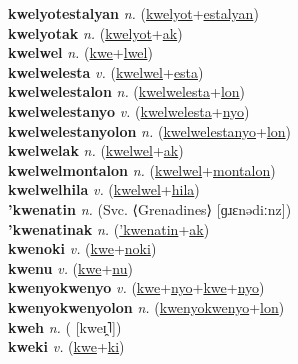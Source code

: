 \textbf{kwelyotestalyan} \textit{n.} (\hyperref[kwelyot]{kwelyot}+\hyperref[estalyan]{estalyan})
 \label{kwelyotestalyan} \\
\textbf{kwelyotak} \textit{n.} (\hyperref[kwelyot]{kwelyot}+\hyperref[ak]{ak})
 \label{kwelyotak} \\
\textbf{kwelwel} \textit{n.} (\hyperref[kwe]{kwe}+\hyperref[lwel]{lwel})
 \label{kwelwel} \\
\textbf{kwelwelesta} \textit{v.} (\hyperref[kwelwel]{kwelwel}+\hyperref[esta]{esta})
 \label{kwelwelesta} \\
\textbf{kwelwelestalon} \textit{n.} (\hyperref[kwelwelesta]{kwelwelesta}+\hyperref[lon]{lon})
 \label{kwelwelestalon} \\
\textbf{kwelwelestanyo} \textit{v.} (\hyperref[kwelwelesta]{kwelwelesta}+\hyperref[nyo]{nyo})
 \label{kwelwelestanyo} \\
\textbf{kwelwelestanyolon} \textit{n.} (\hyperref[kwelwelestanyo]{kwelwelestanyo}+\hyperref[lon]{lon})
 \label{kwelwelestanyolon} \\
\textbf{kwelwelak} \textit{n.} (\hyperref[kwelwel]{kwelwel}+\hyperref[ak]{ak})
 \label{kwelwelak} \\
\textbf{kwelwelmontalon} \textit{n.} (\hyperref[kwelwel]{kwelwel}+\hyperref[montalon]{montalon})
 \label{kwelwelmontalon} \\
\textbf{kwelwelhila} \textit{v.} (\hyperref[kwelwel]{kwelwel}+\hyperref[hila]{hila})
 \label{kwelwelhila} \\
\textbf{'kwenatin} \textit{n.} (Svc. ⟨Grenadines⟩ [ɡɹɛnədiːnz])
 \label{'kwenatin} \\
\textbf{'kwenatinak} \textit{n.} (\hyperref['kwenatin]{'kwenatin}+\hyperref[ak]{ak})
 \label{'kwenatinak} \\
\textbf{kwenoki} \textit{v.} (\hyperref[kwe]{kwe}+\hyperref[noki]{noki})
 \label{kwenoki} \\
\textbf{kwenu} \textit{v.} (\hyperref[kwe]{kwe}+\hyperref[nu]{nu})
 \label{kwenu} \\
\textbf{kwenyokwenyo} \textit{v.} (\hyperref[kwe]{kwe}+\hyperref[nyo]{nyo}+\hyperref[kwe]{kwe}+\hyperref[nyo]{nyo})
 \label{kwenyokwenyo} \\
\textbf{kwenyokwenyolon} \textit{n.} (\hyperref[kwenyokwenyo]{kwenyokwenyo}+\hyperref[lon]{lon})
 \label{kwenyokwenyolon} \\
\textbf{kweh} \textit{n.} ( [kweɪ̯˥])
 \label{kweh} \\
\textbf{kweki} \textit{v.} (\hyperref[kwe]{kwe}+\hyperref[ki]{ki})
 \label{kweki} \\
